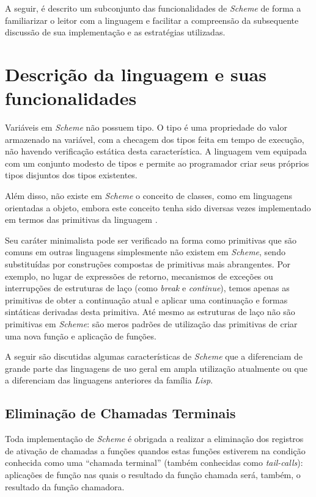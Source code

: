 A seguir, é descrito um subconjunto das funcionalidades de \textit{Scheme} de forma a
familiarizar o leitor com a linguagem e facilitar a compreensão da subsequente
discussão de sua implementação e as estratégias utilizadas.

\section{Descrição da linguagem e suas funcionalidades}
\label{sec:funcionalidades}

Variáveis em \textit{Scheme} não possuem tipo. O tipo é uma propriedade do
valor armazenado na variável, com a checagem dos tipos feita em tempo de
execução, não havendo verificação estática desta característica. A linguagem
vem equipada com um conjunto modesto de tipos e permite ao programador criar
seus próprios tipos disjuntos dos tipos existentes.

Além disso, não existe em \textit{Scheme} o conceito de classes, como em
linguagens orientadas a objeto, embora este conceito tenha sido diversas vezes
implementado em termos das primitivas da linguagem \cite{tinyclos}\cite{meroon3}\cite{scheme/objects}.

Seu caráter minimalista pode ser verificado na forma como primitivas que são
comuns em outras linguagens simplesmente não existem em \textit{Scheme}, sendo
substituídas por construções compostas de primitivas mais abrangentes.  Por
exemplo, no lugar de expressões de retorno, mecanismos de exceções ou
interrupções de estruturas de laço (como \textit{break} e \textit{continue}),
temos apenas as primitivas de obter a continuação atual e aplicar uma
continuação e formas sintáticas derivadas desta primitiva. Até mesmo as
estruturas de laço não são primitivas em \textit{Scheme}: são meros padrões de
utilização das primitivas de criar uma nova função e aplicação de funções.

A seguir são discutidas algumas características de \textit{Scheme} que a
diferenciam de grande parte das linguagens de uso geral em ampla utilização
atualmente ou que a diferenciam das linguagens anteriores da família
\textit{Lisp}.

\subsection{Eliminação de Chamadas Terminais}

Toda implementação de \textit{Scheme} é obrigada a realizar a eliminação dos
registros de ativação de chamadas a funções quandos estas funções estiverem 
na condição conhecida como uma ``chamada terminal'' (também conhecidas como 
\textit{tail-calls}): aplicações de função
nas quais o resultado da função chamada será, também, o resultado da função
chamadora.

